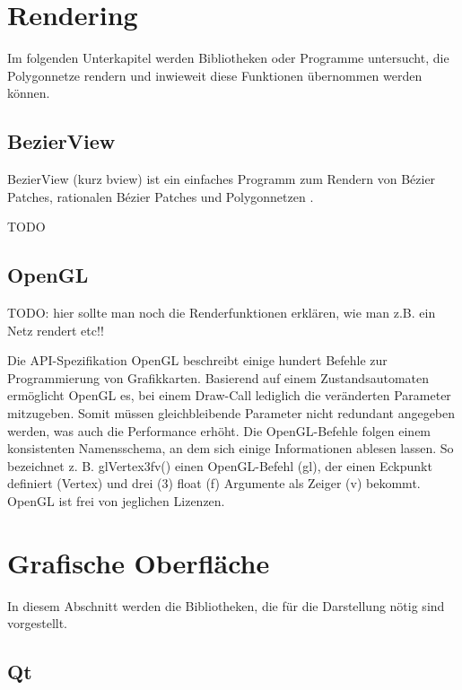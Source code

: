 \section{Rendering}

Im folgenden Unterkapitel werden Bibliotheken oder Programme untersucht, die Polygonnetze rendern und inwieweit diese Funktionen übernommen werden können. 

\subsection{BezierView}

BezierView (kurz bview) ist ein einfaches Programm zum Rendern von Bézier Patches, rationalen Bézier Patches und Polygonnetzen \cite{Peters.bview.27.07.2015}.

TODO

\subsection{OpenGL}

TODO: hier sollte man noch die Renderfunktionen erklären, wie man z.B. ein Netz rendert etc!!

Die API-Spezifikation OpenGL beschreibt einige hundert Befehle zur Programmierung von Grafikkarten.
Basierend auf einem Zustandsautomaten ermöglicht OpenGL es, bei einem Draw-Call lediglich die veränderten Parameter mitzugeben.
Somit müssen gleichbleibende Parameter nicht redundant angegeben werden, was auch die Performance erhöht.
Die OpenGL-Befehle folgen einem konsistenten Namensschema, an dem sich einige Informationen ablesen lassen. So bezeichnet z. B. glVertex3fv() einen OpenGL-Befehl (gl), der einen Eckpunkt definiert (Vertex) und drei (3) float (f) Argumente als Zeiger (v) bekommt.
OpenGL ist frei von jeglichen Lizenzen.

\section{Grafische Oberfläche}

In diesem Abschnitt werden die Bibliotheken, die für die Darstellung nötig sind vorgestellt.

\subsection{Qt} %

